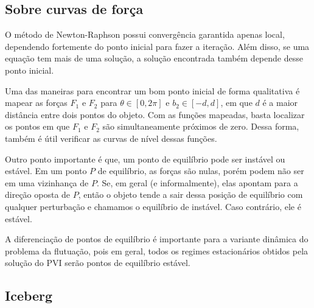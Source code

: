 \documentclass[
	12pt,				%
	oneside,			%
	a4paper,			%
	]{article}
\begin{document}
    \subsection{Sobre curvas de força}
    O método de Newton-Raphson possui convergência garantida apenas local, dependendo fortemente do ponto inicial para fazer a iteração. Além disso, se uma equação tem mais de uma solução, a solução encontrada também depende desse ponto inicial. 
    
    Uma das maneiras para encontrar um bom ponto inicial de forma qualitativa é mapear as forças $F_1$ e $F_2$ para $\theta \in [0, 2\pi]$ e $b_2 \in [-d, d]$, em que $d$ é a maior distância entre dois pontos do objeto. Com as funções mapeadas, basta localizar os pontos em que $F_1$ e $F_2$ são simultaneamente próximos de zero. Dessa forma, também é útil verificar as curvas de nível dessas funções.

    Outro ponto importante é que, um ponto de equilíbrio pode ser instável ou estável. Em um ponto $P$ de equilíbrio, as forças são nulas, porém podem não ser em uma vizinhança de $P$. Se, em geral (e informalmente), elas apontam para a direção oposta de $P$, então o objeto tende a sair dessa posição de equilíbrio com qualquer perturbação e chamamos o equilíbrio de instável. Caso contrário, ele é estável.

    A diferenciação de pontos de equilíbrio é importante para a variante dinâmica do problema da flutuação, pois em geral, todos os regimes estacionários obtidos pela solução do PVI serão pontos de equilíbrio estável.



    \subsection{Iceberg}
    \label{sec:ice}
\end{document}
